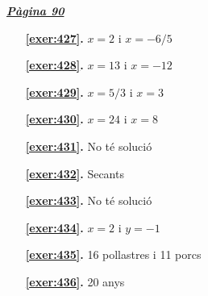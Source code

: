 
\hyperlink{page.90}{\textbf{\em Pàgina 90}}
\begin{enumerate}
\item[\fontfamily{phv}\selectfont\color{blue}\textbf{\ref{exer:427}. }] \label{ans:427} 
$x=2$ i $x=-6/5$
 \end{enumerate}
\begin{enumerate}
\item[\fontfamily{phv}\selectfont\color{blue}\textbf{\ref{exer:428}. }] \label{ans:428} 
$x=13$ i $x=-12$
\item[\fontfamily{phv}\selectfont\color{blue}\textbf{\ref{exer:429}. }] \label{ans:429} 
$x=5/3$ i $x=3$
\item[\fontfamily{phv}\selectfont\color{blue}\textbf{\ref{exer:430}. }] \label{ans:430} 
$x=24$ i $x=8$
\item[\fontfamily{phv}\selectfont\color{blue}\textbf{\ref{exer:431}. }] \label{ans:431} 
No té solució
\item[\fontfamily{phv}\selectfont\color{blue}\textbf{\ref{exer:432}. }] \label{ans:432} 
Secants
\item[\fontfamily{phv}\selectfont\color{blue}\textbf{\ref{exer:433}. }] \label{ans:433} 
No té solució
\item[\fontfamily{phv}\selectfont\color{blue}\textbf{\ref{exer:434}. }] \label{ans:434} 
$x=2$ i $y=-1$
\item[\fontfamily{phv}\selectfont\color{blue}\textbf{\ref{exer:435}. }] \label{ans:435} 
16 pollastres i 11 porcs
\item[\fontfamily{phv}\selectfont\color{blue}\textbf{\ref{exer:436}. }] \label{ans:436} 
20 anys
 \end{enumerate}

 \vspace{1cm} 
 

\vspace{0.3cm}



